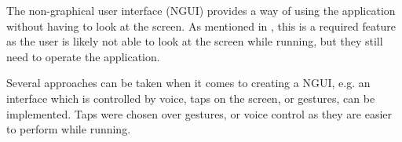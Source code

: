 The non-graphical user interface (NGUI) provides a way of using the application without having to look at the screen. As mentioned in , this is a required feature as the user is likely not able to look at the screen while running, but they still need to operate the application.

Several approaches can be taken when it comes to creating a NGUI, e.g. an interface which is controlled by voice, taps on the screen, or gestures, can be implemented. Taps were chosen over gestures, or voice control as they are easier to perform while running. 

